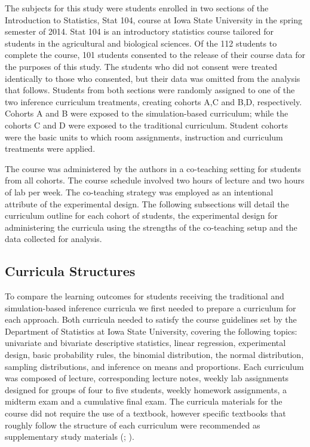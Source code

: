 \documentclass[11pt]{isuthesis}\usepackage[]{graphicx}\usepackage[]{color}
\begin{document}
The subjects for this study were students enrolled in two sections of the Introduction to Statistics, Stat 104, course at Iowa State University in the spring semester of 2014. Stat 104 is an introductory statistics course tailored for students in the agricultural and biological sciences. Of the 112 students to complete the course, 101 students consented to the release of their course data for the purposes of this study.   The students who did not consent were treated identically to those who consented, but their data was omitted from the analysis that follows.  Students from both sections were randomly assigned to one of the two inference curriculum treatments, creating cohorts A,C and B,D, respectively. Cohorts A and B were exposed to the simulation-based curriculum; while the cohorts C and D were exposed to the traditional curriculum. Student cohorts were the basic units to which room assignments, instruction and curriculum treatments were applied.

The course was administered by the authors in a co-teaching setting for students from all cohorts. The course schedule involved two hours of lecture and two hours of lab per week.  The co-teaching strategy was employed as an intentional attribute of the experimental design. The following subsections will detail the curriculum outline for each cohort of students, the experimental design for administering the curricula using the strengths of the co-teaching setup and the data collected for analysis.
\subsection{Curricula Structures}
\label{curric}

To compare the learning outcomes for students receiving the traditional and simulation-based inference curricula we first needed to prepare a curriculum for each approach.  Both curricula needed to satisfy the course guidelines set by the Department of Statistics at Iowa State University, covering the following topics: univariate and bivariate descriptive statistics, linear regression, experimental design, basic probability rules, the binomial distribution, the normal distribution, sampling distributions, and inference on means and proportions. Each curriculum was composed of lecture, corresponding lecture notes, weekly lab assignments designed for groups of four to five students, weekly homework assignments, a midterm exam and a cumulative final exam.  The curricula materials for the course did not require the use of a textbook, however specific textbooks that roughly follow the structure of each curriculum were recommended as supplementary study materials (\citealt{AgrestiFranklin}; \citealt{Lock5}).
\end{document}
